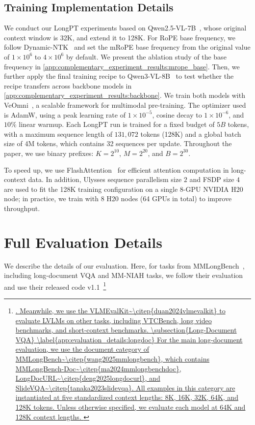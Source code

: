 \documentclass{llmxive}
\begin{document}
{\subsection{Training Implementation Details}
\label{app:final_recipe:implementation_details}
We conduct our LongPT experiments based on Qwen2.5-VL-7B~\citep{bai2025qwen2}, whose original context window is 32K, and extend it to 128K.
For RoPE base frequency, we follow Dynamic-NTK~\citep{dynamicntk} and set the mRoPE base frequency from the original value of $1\times 10^6$ to $4\times 10^6$ by default.
We present the ablation study of the base frequency in \cref{app:complementary_experiment_results:mrope_base}.
Then, we further apply the final training recipe to Qwen3-VL-8B~\citep{bai2025qwen3} to test whether the recipe transfers across backbone models in \cref{app:complementary_experiment_results:backbone}.
We train both models with VeOmni~\citep{ma2025veomni}, a scalable framework for multimodal pre-training.
The optimizer used is AdamW, using a peak learning rate of $1\times10^{-5}$, cosine decay to $1\times10^{-6}$, and $10\%$ linear warmup.
Each LongPT run is trained for a fixed budget of $5B$ tokens, with a maximum sequence length of $131{,}072$ tokens (128K) and a global batch size of 4M tokens, which contains 32 sequences per update.
Throughout the paper, we use binary prefixes: $K=2^{10}$, $M=2^{20}$, and $B=2^{30}$.

To speed up, we use FlashAttention~\citep{daoflashattention} for efficient attention computation in long-context data. In addition, Ulysses sequence parallelism size $2$ and FSDP size $4$ are used to fit the 128K training configuration on a single 8-GPU NVIDIA H20 node; in practice, we train with 8 H20 nodes (64 GPUs in total) to improve throughput.

\section{Full Evaluation Details}
\label{app:evaluation_details}
We describe the details of our evaluation. Here, for tasks from MMLongBench~\citep{wang2025mmlongbench}, including long-document VQA and MM-NIAH tasks, we follow their evaluation and use their released code v1.1~\footnote{\url{.
Meanwhile, we use the VLMEvalKit~\citep{duan2024vlmevalkit} to evaluate LVLMs on other tasks, including VTCBench, long video benchmarks, and short-context benchmarks.


\subsection{Long-Document VQA}
\label{app:evaluation_details:longdoc}
For the main long-document evaluation, we use the document category of MMLongBench~\citep{wang2025mmlongbench}, which contains MMLongBench-Doc~\citep{ma2024mmlongbenchdoc}, LongDocURL~\citep{deng2025longdocurl}, and SlideVQA~\citep{tanaka2023slidevqa}.
All examples in this category are instantiated at five standardized context lengths: 8K, 16K, 32K, 64K, and 128K tokens.
Unless otherwise specified, we evaluate each model at 64K and 128K context lengths.

}}}
\end{document}
